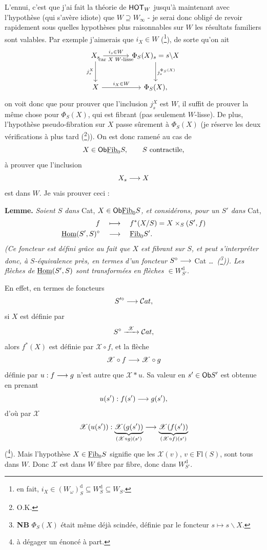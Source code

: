 L'ennui, c'est que j'ai fait la théorie de $\mathsf{HOT}_W$ jusqu'à maintenant avec l'hypothèse (qui s'avère idiote) que $W\supseteq W_\infty$ - je serai donc obligé de revoir rapidement sous quelles hypothèses plus raisonnables sur $W$ les résultats familiers sont valables. Par exemple j'aimerais que $i_X\in W$ (\footnote[50]{en fait, $i_X\in(W_\omega)^{\mathrm{d}}_S\subseteq W^{\mathrm{d}}_S\subseteq W_S$.}), de sorte qu'on ait
\[
\begin{tikzcd}[column sep=large, row sep=large]
X_s \arrow[r, "i_s\in W", "\text{car $X$ $W$-lisse}"'] \arrow[d, "j^X_s"'] & \Phi_S(X)_s=s\backslash X \arrow[d, "j_s^{\Phi_S(X)}"] \\
X \arrow[r, "i_X\in W"] & \Phi_S(X),
\end{tikzcd}
\]
on voit donc que pour prouver que l'inclusion $j^X_s$ est $W$, il suffit de prouver la même chose pour $\Phi_S(X)$, qui est fibrant (pas seulement $W$-lisse). De plus, l'hypothèse pseudo-fibration sur $X$ passe sûrement à $\Phi_S(X)$ (je réserve les deux vérifications à plus tard (\footnote[51]{O.K.})). On est donc ramené au cas de
\[ X\in\mathsf{Ob}\underline{\mathrm{Fib}}_0S, \qquad S\text{ contractile,} \]
à prouver que l'inclusion
\[ X_s\longrightarrow X \]
est dans $W$. Je vais prouver ceci :

\textbf{Lemme.} \textit{Soient $S$ dans} Cat, \textit{$X\in\mathsf{Ob}\underline{\mathrm{Fib}}_0S$, et considérons, pour un $S'$ dans} Cat,
\[
\begin{aligned}
f &\quad\longmapsto\quad f^*(X/S)=X\times_S(S',f)\\
\underline{\operatorname{Hom}}(S',S)^{\circ} &\quad\longrightarrow\quad \underline{\mathrm{Fib}}_0S'.
\end{aligned}
\]
\textit{(Ce foncteur est défini grâce au fait que $X$ est fibrant sur $S$, et peut s'interpréter donc, à $S$-équivalence près, en termes d'un foncteur $S^{\circ}\longrightarrow$} Cat \textit{\dots\ (\footnote[52]{\textbf{NB} $\Phi_S(X)$ était même déjà scindée, définie par le foncteur $s\longmapsto s\backslash X$.})). Les flèches de $\underline{\operatorname{Hom}}(S',S)$ sont transformées en flèches $\in W^{\mathrm{d}}_{S'}$.}

En effet, en termes de foncteurs
\[ S'^{\circ}\longrightarrow\mathcal{C}at, \]
si $X$ est définie par
\[ S^{\circ}\xrightarrow{\ \mathscr{X}\ }\Cat, \]
alors $f^*(X)$ est définie par $\mathscr{X}\circ f$, et la flèche
\[ \mathscr{X}\circ f\longrightarrow\mathscr{X}\circ g \]
définie par $u : f\longrightarrow g$ n'est autre que $\mathscr{X}*u$. Sa valeur en $s'\in\mathsf{Ob} S'$ est obtenue en prenant
\[ u(s') : f(s')\longrightarrow g(s'), \]
d'où par $\mathscr{X}$
\[ \mathscr{X}(u(s')) : \underbrace{\mathscr{X}(g(s'))}_{(\mathscr{X}\circ g)(s')}\longrightarrow\underbrace{\mathscr{X}(f(s'))}_{(\mathscr{X}\circ f)(s')} \]
(\footnote[53]{à dégager un énoncé à part.}). Mais l'hypothèse $X\in\underline{\mathrm{Fib}}_0S$ signifie que les $\mathscr{X}(v)$, $v\in\mathrm{Fl}(S)$, sont tous dans $W$. Donc
$\mathscr{X}$ est dans $W$ fibre par fibre, donc dans $W^{\mathrm{d}}_{S'}$.

